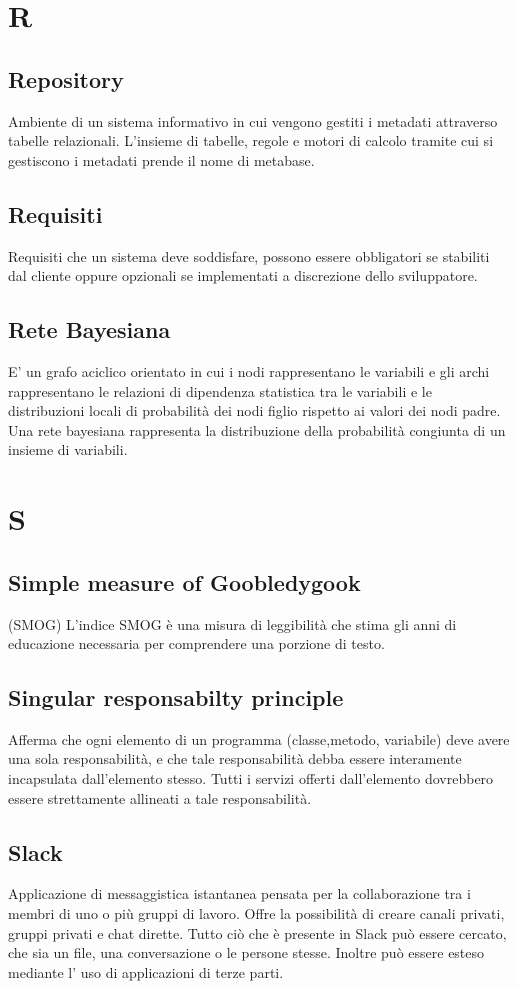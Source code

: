 \section{R}
    \subsection*{Repository}
Ambiente di un sistema informativo in cui vengono gestiti i metadati attraverso tabelle relazionali. L’insieme di tabelle, regole e motori di calcolo tramite cui si gestiscono i metadati prende il nome di metabase.
    \subsection*{Requisiti}
Requisiti che un sistema deve soddisfare, possono essere obbligatori se stabiliti dal cliente oppure opzionali se implementati a discrezione dello sviluppatore.
    \subsection*{Rete Bayesiana}
E’ un grafo aciclico orientato in cui i nodi rappresentano le variabili e gli archi rappresentano le relazioni di dipendenza statistica tra le variabili e le distribuzioni locali di probabilità dei nodi figlio rispetto ai valori dei nodi padre. Una rete bayesiana rappresenta la distribuzione della probabilità congiunta di un insieme di variabili.
\newpage

\section{S}
    \subsection*{Simple measure of Goobledygook}
(SMOG) L’indice SMOG è una misura di leggibilità che stima gli anni di educazione necessaria per comprendere una porzione di testo.
    \subsection*{Singular responsabilty principle}
Afferma che ogni elemento di un programma (classe,metodo, variabile) deve avere una sola responsabilità, e che tale responsabilità debba essere interamente incapsulata dall’elemento stesso. Tutti i servizi offerti dall’elemento dovrebbero essere strettamente allineati a tale responsabilità.
    \subsection*{Slack}
Applicazione di messaggistica istantanea pensata per la collaborazione tra i membri di uno o più gruppi di lavoro.  Offre la possibilità di creare canali privati, gruppi privati e chat dirette. Tutto ciò che è presente in Slack può essere cercato, che sia un file, una conversazione o le persone stesse. Inoltre può essere esteso mediante l’ uso di applicazioni di terze parti.
